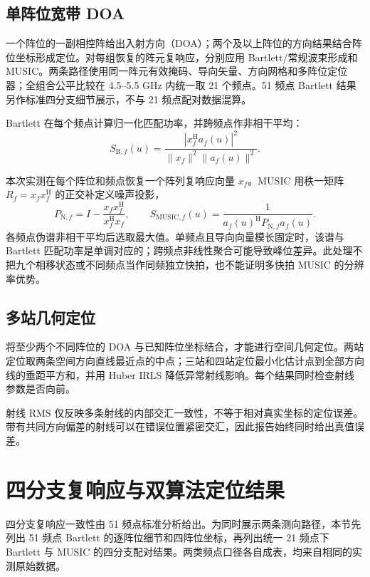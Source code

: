 \documentclass[UTF8,12pt,a4paper]{ctexart}
\begin{document}
\subsection{单阵位宽带 DOA}

一个阵位的一副相控阵给出入射方向（DOA）；两个及以上阵位的方向结果结合阵位坐标形成定位。对每组恢复的阵元复响应，分别应用 Bartlett/常规波束形成和 MUSIC。两条路径使用同一阵元有效掩码、导向矢量、方向网格和多阵位定位器；全组合公平比较在 4.5--5.5 GHz 内统一取 21 个频点。51 频点 Bartlett 结果另作标准四分支细节展示，不与 21 频点配对数据混算。

Bartlett 在每个频点计算归一化匹配功率，并跨频点作非相干平均：
\begin{equation}
  S_{\mathrm{B},f}(u)=\frac{|x_f^{\mathrm H}a_f(u)|^2}{\|x_f\|^2\|a_f(u)\|^2}.
\end{equation}

本次实测在每个阵位和频点恢复一个阵列复响应向量 $x_f$。MUSIC 用秩一矩阵 $R_f=x_fx_f^{\mathrm H}$ 的正交补定义噪声投影，
\begin{equation}
  P_{\mathrm N,f}=I-\frac{x_fx_f^{\mathrm H}}{x_f^{\mathrm H}x_f},\qquad
  S_{\mathrm{MUSIC},f}(u)=\frac{1}{a_f(u)^{\mathrm H}P_{\mathrm N,f}a_f(u)}.
\end{equation}
各频点伪谱非相干平均后选取最大值。单频点且导向向量模长固定时，该谱与 Bartlett 匹配功率是单调对应的；跨频点非线性聚合可能导致峰位差异。此处理不把九个相移状态或不同频点当作同频独立快拍，也不能证明多快拍 MUSIC 的分辨率优势。

\subsection{多站几何定位}

将至少两个不同阵位的 DOA 与已知阵位坐标结合，才能进行空间几何定位。两站定位取两条空间方向直线最近点的中点；三站和四站定位最小化估计点到全部方向线的垂距平方和，并用 Huber IRLS 降低异常射线影响。每个结果同时检查射线参数是否向前。

射线 RMS 仅反映多条射线的内部交汇一致性，不等于相对真实坐标的定位误差。带有共同方向偏差的射线可以在错误位置紧密交汇，因此报告始终同时给出真值误差。

\section{四分支复响应与双算法定位结果}

四分支复响应一致性由 51 频点标准分析给出。为同时展示两条测向路径，本节先列出 51 频点 Bartlett 的逐阵位细节和四阵位坐标，再列出统一 21 频点下 Bartlett 与 MUSIC 的四分支配对结果。两类频点口径各自成表，均来自相同的实测原始数据。
\end{document}
